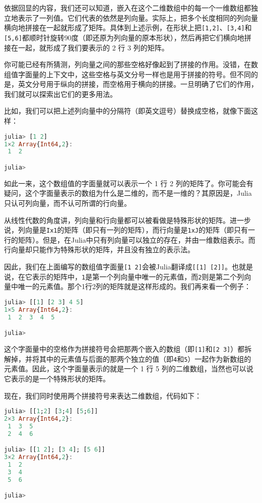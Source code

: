 依据回显的内容，我们还可以知道，嵌入在这个二维数组中的每一个一维数组都独立地表示了一列值。它们代表的依然是列向量。实际上，把多个长度相同的列向量横向地拼接在一起就形成了矩阵。具体到上述示例，在形状上把\verb|[1,2]|、\verb|[3,4]|和\verb|[5,6]|都顺时针旋转90度（即还原为列向量的原本形状），然后再把它们横向地拼接在一起，就形成了我们要表示的 2 行 3 列的矩阵。

你可能已经有所猜测，列向量之间的那些空格好像起到了拼接的作用。没错，在数组值字面量的上下文中，这些空格与英文分号一样也是用于拼接的符号。但不同的是，英文分号用于纵向的拼接，而空格用于横向的拼接。一旦明确了它们的作用，我们就可以探索出它们的更多用法。

比如，我们可以把上述列向量中的分隔符（即英文逗号）替换成空格，就像下面这样：

\begin{lstlisting}[language=julia]
julia> [1 2]
1×2 Array{Int64,2}:
 1  2

julia> 
\end{lstlisting}

如此一来，这个数组值的字面量就可以表示一个 1 行 2 列的矩阵了。你可能会有疑问，这个字面量表示的数组为什么是二维的，而不是一维的？其原因是，Julia 只认可列向量，而不认可所谓的行向量。

从线性代数的角度讲，列向量和行向量都可以被看做是特殊形状的矩阵。进一步说，列向量是\verb|Ix1|的矩阵（即只有一列的矩阵），而行向量是\verb|1xJ|的矩阵（即只有一行的矩阵）。但是，在Julia中只有列向量可以独立的存在，并由一维数组表示。而行向量却只能作为特殊形状的矩阵，并且没有独立的表示法。

因此，我们在上面编写的数组值字面量\verb|[1 2]|会被Julia翻译成\verb|[[1] [2]]|。也就是说，在它表示的矩阵中，\verb|1|是第一个列向量中唯一的元素值，而\verb|2|则是第二个列向量中唯一的元素值。那个1行2列的矩阵就是这样形成的。我们再来看一个例子：

\begin{lstlisting}[language=julia]
julia> [[1] [2 3] 4 5]
1×5 Array{Int64,2}:
 1  2  3  4  5

julia> 
\end{lstlisting}

这个字面量中的空格作为拼接符号会把那两个嵌入的数组（即\verb|[1]|和\verb|[2 3]|）都拆解掉，并将其中的元素值与后面的那两个独立的值（即\verb|4|和\verb|5|）一起作为新数组的元素值。因此，这个字面量表示的就是一个 1 行 5 列的二维数组，当然也可以说它表示的是一个特殊形状的矩阵。

现在，我们同时使用两个拼接符号来表达二维数组，代码如下：

\begin{lstlisting}[language=julia]
julia> [[1;2] [3;4] [5;6]]
2×3 Array{Int64,2}:
 1  3  5
 2  4  6

julia> [[1 2]; [3 4]; [5 6]]
3×2 Array{Int64,2}:
 1  2
 3  4
 5  6

julia> 
\end{lstlisting}

